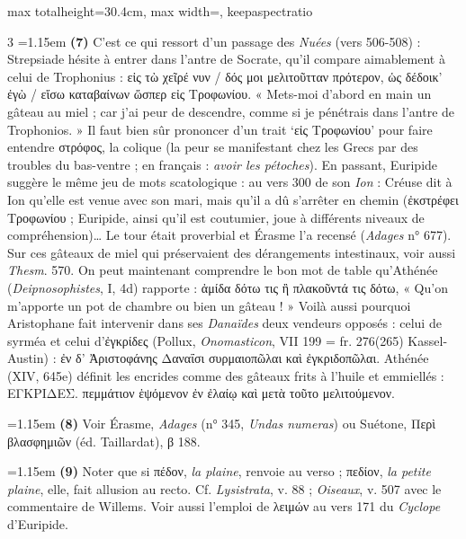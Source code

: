 \documentclass[11pt,twoside]{book}
\newcommand{\italique}[1]{\textit{#1}}
\newcommand{\latin}[1]{\textit{#1}}
\begin{document}
\begin{adjustbox}{max totalheight=30.4cm, max width=\textwidth, keepaspectratio}
\begin{minipage}{\textwidth}
{\begin{multicols}{3}
\noindent\hangindent=1.15em {\color{sepiaNote}\textbf{(7)}} C'est ce qui ressort d'un passage des \italique{Nuées} (vers 506-508) : Strepsiade hésite à entrer dans l'antre de Socrate, qu'il compare aimablement à celui de Trophonius : εἰς τὼ χεῖρέ νυν / δός μοι μελιτοῦτταν πρότερον, ὡς δέδοικ' ἐγὼ / εἴσω καταβαίνων ὥσπερ εἰς Τροφωνίου. « Mets-moi d'abord en main un gâteau au miel ; car j'ai peur de descendre, comme si je pénétrais dans l'antre de Trophonios. » Il faut bien sûr prononcer d'un trait `εἰς Τροφωνίου' pour faire entendre στρόφος, la colique (la peur se manifestant chez les Grecs par des troubles du bas-ventre ; en français : \italique{avoir les pétoches}). En passant, Euripide suggère le même jeu de mots scatologique : au vers 300 de son \italique{Ion} : Créuse dit à Ion qu'elle est venue avec son mari, mais qu'il a dû s'arrêter en chemin (ἐκστρέφει Τροφωνίου ; Euripide, ainsi qu'il est coutumier, joue à différents niveaux de compréhension)… Le tour était proverbial et Érasme l'a recensé (\italique{Adages} n° 677). Sur ces gâteaux de miel qui préservaient des dérangements intestinaux, voir aussi \italique{Thesm}. 570. On peut maintenant comprendre le bon mot de table qu'Athénée (\italique{Deipnosophistes}, I, 4d) rapporte : ἀμίδα δότω τις ἢ πλακοῦντά τις δότω, « Qu'on m'apporte un pot de chambre ou bien un gâteau ! » Voilà aussi pourquoi Aristophane fait intervenir dans ses \italique{Danaïdes} deux vendeurs opposés : celui de syrméa et celui d'ἐγκρίδες (Pollux, \italique{Onomasticon}, VII 199 = fr. 276(265) Kassel-Austin) : ἐν δ' Ἀριστοφάνης Δαναΐσι συρμαιοπῶλαι καὶ ἐγκριδοπῶλαι. Athénée (XIV, 645e) définit les encrides comme des gâteaux frits à l'huile et emmiellés : ΕΓΚΡΙΔΕΣ. πεμμάτιον ἑψόμενον ἐν ἐλαίῳ καὶ μετὰ τοῦτο μελιτούμενον.
\par\vspace{1.5pt}
\noindent\hangindent=1.15em {\color{sepiaNote}\textbf{(8)}} Voir Érasme, \italique{Adages} (n° 345, \latin{Undas numeras}) ou Suétone, Περὶ βλασφημιῶν (éd. Taillardat), β 188.
\par\vspace{1.5pt}
\noindent\hangindent=1.15em {\color{sepiaNote}\textbf{(9)}} Noter que si πέδον, \italique{la plaine}, renvoie au verso ; πεδίον, \italique{la petite plaine}, elle, fait allusion au recto. Cf. \italique{Lysistrata}, v. 88 ; \italique{Oiseaux}, v. 507 avec le commentaire de Willems. Voir aussi l'emploi de λειμών au vers 171 du \italique{Cyclope} d'Euripide.
\par\vspace{1.5pt}

\end{multicols}}
\end{minipage}
\end{adjustbox}
\end{document}
